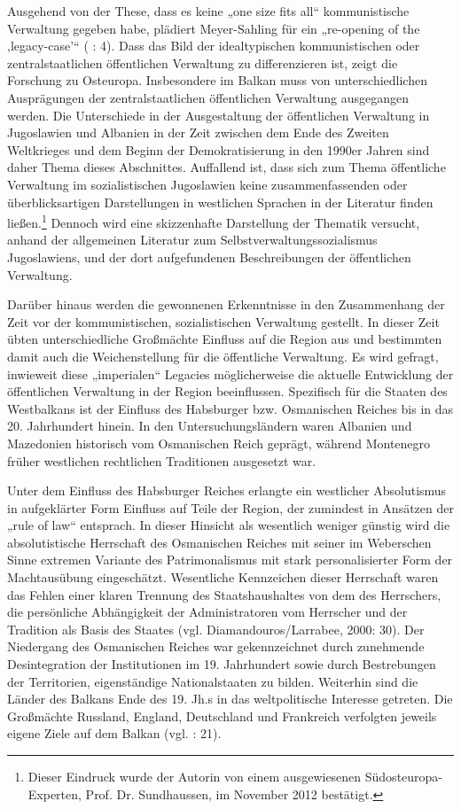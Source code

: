 Ausgehend von der These, dass es keine „one size fits all“ kommunistische Verwaltung gegeben habe, plädiert Meyer-Sahling für ein „re-opening of the ‚legacy-case’“ (\cite{meyersah08b} : 4). Dass das Bild der idealtypischen kommunistischen oder zentralstaatlichen öffentlichen Verwaltung zu differenzieren ist, zeigt die Forschung zu Osteuropa. Insbesondere im Balkan muss von unterschiedlichen Ausprägungen der zentralstaatlichen öffentlichen Verwaltung ausgegangen werden. Die Unterschiede in der Ausgestaltung der öffentlichen Verwaltung in Jugoslawien und Albanien in der Zeit zwischen dem Ende des Zweiten Weltkrieges und dem Beginn der Demokratisierung in den 1990er Jahren sind daher Thema dieses Abschnittes. Auffallend ist, dass sich zum Thema öffentliche Verwaltung im sozialistischen Jugoslawien keine zusammenfassenden oder überblicksartigen Darstellungen in westlichen Sprachen in der Literatur finden ließen.\footnote{Dieser Eindruck wurde der Autorin von einem ausgewiesenen Südosteuropa-Experten, Prof. Dr. Sundhaussen, im November 2012 bestätigt.} Dennoch wird eine skizzenhafte Darstellung der Thematik versucht, anhand der allgemeinen Literatur zum Selbstverwaltungssozialismus Jugoslawiens, und der dort aufgefundenen Beschreibungen der öffentlichen Verwaltung.\par
Darüber hinaus werden die gewonnenen Erkenntnisse in den Zusammenhang der Zeit vor der kommunistischen, sozialistischen Verwaltung gestellt. In dieser Zeit übten unterschiedliche Großmächte Einfluss auf die Region aus und bestimmten damit auch die Weichenstellung für die öffentliche Verwaltung. Es wird gefragt, inwieweit diese „imperialen“ Legacies möglicherweise die aktuelle Entwicklung der öffentlichen Verwaltung in der Region beeinflussen. Spezifisch für die Staaten des Westbalkans ist der Einfluss des Habsburger bzw. Osmanischen Reiches bis in das 20. Jahrhundert hinein. In den Untersuchungsländern waren Albanien und Mazedonien historisch vom Osmanischen Reich geprägt, während Montenegro früher westlichen rechtlichen Traditionen ausgesetzt war.\par
Unter dem Einfluss des Habsburger Reiches erlangte ein westlicher Absolutismus in aufgeklärter Form Einfluss auf Teile der Region, der zumindest in Ansätzen der „rule of law“ entsprach. In dieser Hinsicht als wesentlich weniger günstig wird die absolutistische Herrschaft des Osmanischen Reiches mit seiner im Weberschen Sinne extremen Variante des Patrimonalismus mit stark personalisierter Form der Machtausübung eingeschätzt. Wesentliche Kennzeichen dieser Herrschaft waren das Fehlen einer klaren Trennung des Staatshaushaltes von dem des Herrschers, die persönliche Abhängigkeit der Administratoren vom Herrscher und der Tradition als Basis des Staates (vgl. Diamandouros/Larrabee, 2000: 30). Der Niedergang des Osmanischen Reiches war gekennzeichnet durch zunehmende Desintegration der Institutionen im 19. Jahrhundert sowie durch Bestrebungen der Territorien, eigenständige Nationalstaaten zu bilden. Weiterhin sind die Länder des Balkans Ende des 19. Jh.s in das weltpolitische Interesse getreten. Die Großmächte Russland, England, Deutschland und Frankreich verfolgten jeweils eigene Ziele auf dem Balkan (vgl. \cite{farada02} : 21).\par
